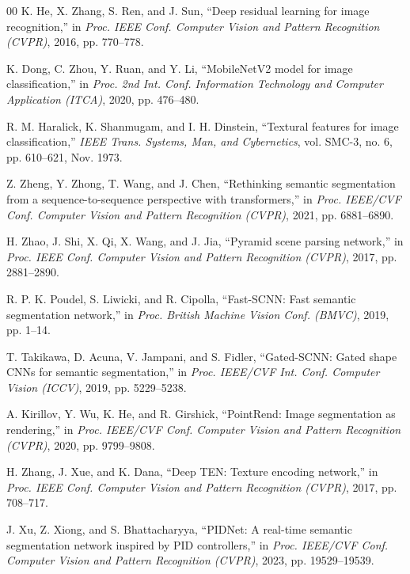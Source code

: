 \begin{thebibliography}{00}
K. He, X. Zhang, S. Ren, and J. Sun, ``Deep residual learning for image recognition,'' in \textit{Proc. IEEE Conf. Computer Vision and Pattern Recognition (CVPR)}, 2016, pp. 770--778.

K. Dong, C. Zhou, Y. Ruan, and Y. Li, ``MobileNetV2 model for image classification,'' in \textit{Proc. 2nd Int. Conf. Information Technology and Computer Application (ITCA)}, 2020, pp. 476--480.

R. M. Haralick, K. Shanmugam, and I. H. Dinstein, ``Textural features for image classification,'' \textit{IEEE Trans. Systems, Man, and Cybernetics}, vol. SMC-3, no. 6, pp. 610--621, Nov. 1973.

Z. Zheng, Y. Zhong, T. Wang, and J. Chen, ``Rethinking semantic segmentation from a sequence-to-sequence perspective with transformers,'' in \textit{Proc. IEEE/CVF Conf. Computer Vision and Pattern Recognition (CVPR)}, 2021, pp. 6881--6890.

H. Zhao, J. Shi, X. Qi, X. Wang, and J. Jia, ``Pyramid scene parsing network,'' in \textit{Proc. IEEE Conf. Computer Vision and Pattern Recognition (CVPR)}, 2017, pp. 2881--2890.

R. P. K. Poudel, S. Liwicki, and R. Cipolla, ``Fast-SCNN: Fast semantic segmentation network,'' in \textit{Proc. British Machine Vision Conf. (BMVC)}, 2019, pp. 1--14.

T. Takikawa, D. Acuna, V. Jampani, and S. Fidler, ``Gated-SCNN: Gated shape CNNs for semantic segmentation,'' in \textit{Proc. IEEE/CVF Int. Conf. Computer Vision (ICCV)}, 2019, pp. 5229--5238.

A. Kirillov, Y. Wu, K. He, and R. Girshick, ``PointRend: Image segmentation as rendering,'' in \textit{Proc. IEEE/CVF Conf. Computer Vision and Pattern Recognition (CVPR)}, 2020, pp. 9799--9808.

H. Zhang, J. Xue, and K. Dana, ``Deep TEN: Texture encoding network,'' in \textit{Proc. IEEE Conf. Computer Vision and Pattern Recognition (CVPR)}, 2017, pp. 708--717.

J. Xu, Z. Xiong, and S. Bhattacharyya, ``PIDNet: A real-time semantic segmentation network inspired by PID controllers,'' in \textit{Proc. IEEE/CVF Conf. Computer Vision and Pattern Recognition (CVPR)}, 2023, pp. 19529--19539.


\end{thebibliography}
